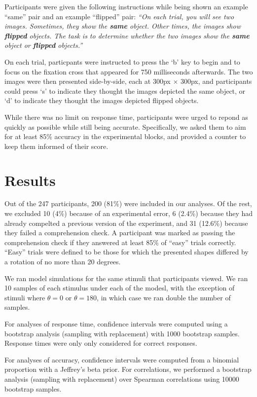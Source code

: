 \documentclass[10pt,letterpaper]{article}
\begin{document}
Participants were given the following instructions while being shown
an example ``same'' pair and an example ``flipped'' pair: \textit{``On
  each trial, you will see two images. Sometimes, they show the
  \textbf{same} object. Other times, the images show \textbf{flipped}
  objects. The task is to determine whether the two images show the
  \textbf{same} object or \textbf{flipped} objects.''}

On each trial, particpants were instructed to press the `b' key to
begin and to focus on the fixation cross that appeared for 750
milliseconds afterwards. The two images were then presented
side-by-side, each at 300px $\times$ 300px, and participants could
press `s' to indicate they thought the images depicted the same
object, or `d' to indicate they thought the images depicted flipped
objects.

While there was no limit on response time, participants were urged to
repond as quickly as possible while still being
accurate. Specifically, we asked them to aim for at least 85\%
accuracy in the experimental blocks, and provided a counter to keep
them informed of their score.

\section{Results}

Out of the 247 participants, 200 (81\%) were included in our
analyses. Of the rest, we excluded 10 (4\%) because of an experimental
error, 6 (2.4\%) because they had already compelted a previous version
of the experiment, and 31 (12.6\%) because they failed a comprehension
check. A participant was marked as passing the comprehension check if
they answered at least 85\% of ``easy'' trials correctly. ``Easy''
trials were defined to be those for which the presented shapes
differed by a rotation of no more than 20 degrees.

We ran model simulations for the same stimuli that participants
viewed. We ran 10 samples of each stimulus under each of the modesl,
with the exception of stimuli where $\theta=0$ or $\theta=180$, in
which case we ran double the number of samples.

For analyses of response time, confidence intervals were computed
using a bootstrap analysis (sampling with replacement) with 1000
bootstrap samples. Response times were only only considered for
correct responses.

For analyses of accuracy, confidence intervals were
computed from a binomial proportion with a Jeffrey's beta prior.  For
correlations, we performed a bootstrap analysis (sampling with
replacement) over Spearman correlations using 10000 bootstrap samples.
\end{document}
